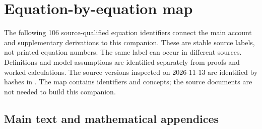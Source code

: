 \section{Equation-by-equation map}\label{coverage:equations}

The following 106 source-qualified equation identifiers connect the main account and supplementary derivations to this companion. These are stable source labels, not printed equation numbers. The same label can occur in different sources. Definitions and model assumptions are identified separately from proofs and worked calculations. The source versions inspected on 2026-11-13 are identified by hashes in . The map contains identifiers and concepts; the source documents are not needed to build this companion.


\subsection{Main text and mathematical appendices}

